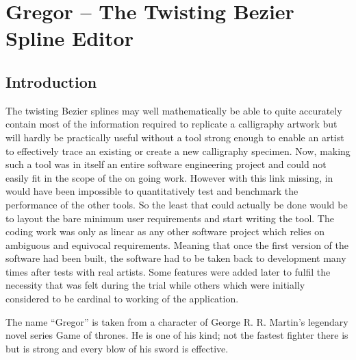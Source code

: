 \section{Gregor -- The Twisting Bezier Spline Editor}
\subsection{Introduction}
{
    The twisting Bezier splines may well mathematically be able to quite accurately contain most of the information required to replicate a calligraphy artwork but will hardly be practically useful without a tool strong enough to enable an artist to effectively trace an existing or create a new calligraphy specimen. Now, making such a tool was in itself an entire software engineering project and could not easily fit in the scope of the on going work. However with this link missing, in would have been impossible to quantitatively test and benchmark the performance of the other tools. So the least that could actually be done would be to layout the bare minimum user requirements and start writing the tool. The coding work was only as linear as any other software project which relies on ambiguous and equivocal requirements. Meaning that once the first version of the software had been built, the software had to be taken back to development many times after tests with real artists. Some features were added later to fulfil the necessity that was felt during the trial while others which were initially considered to be cardinal to working of the application.

    The name ``Gregor'' is taken from a character of George R. R. Martin's legendary novel\cite{bib19} series Game of thrones. He is one of his kind; not the fastest fighter there is but is strong and every blow of his sword is effective.

}
